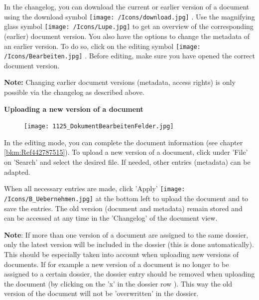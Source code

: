 In the changelog, you can download the current or earlier version of a document using the download symbol \texttt{[image: /Icons/download.jpg]} . Use the magnifying glass symbol \texttt{[image: /Icons/Lupe.jpg]}  to get an overview of the corresponding (earlier) document version. You also have the options to change the metadata of an earlier version. To do so, click on the editing symbol \texttt{[image: /Icons/Bearbeiten.jpg]} . Before editing, make sure you have opened the correct document version.

\vspace{\baselineskip}

\textbf{Note:} Changing earlier document versions (metadata, access rights) is only possible via the changelog as described above.

\vspace{\baselineskip}

\textbf{Uploading a new version of a document}

\vspace{\baselineskip}

\begin{figure}
\vspace{-35pt}
\texttt{[image: 1125\_DokumentBearbeitenFelder.jpg]}
\end{figure}
In the editing mode, you can complete the document information (see chapter \ref{bkm:Ref442787515}). To upload a new version of a document, click under 'File' on 'Search'  and select the desired file. If needed, other entries (metadata) can be adapted.

\vspace{\baselineskip}

When all necessary entries are made, click 'Apply' \texttt{[image: /Icons/B\_Uebernehmen.jpg]} at the bottom left to upload the document and to save the entries. The old version (document and metadata) remain stored and can be accessed at any time in the 'Changelog' of the document view.

\vspace{\baselineskip}
\vspace{\baselineskip}

\textbf{Note}: If more than one version of a document are assigned to the same dossier, only the latest version will be included in the dossier (this is done automatically). This should be especially taken into account when uploading new versions of documents. If for example a new version of a document is no longer to be assigned to a certain dossier, the dossier entry should be removed when uploading the document (by clicking on the 'x' in the dossier row ). This way the old version of the document will not be 'overwritten' in the dossier.  

